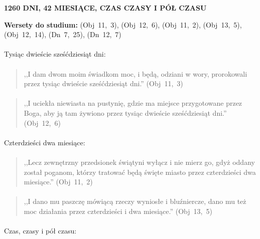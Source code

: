 \documentclass[10pt,a4paper,oneside]{article}
\begin{document}
\centerline{\textbf{\MakeUppercase{1260 dni, 42 miesiące, czas czasy i pół czasu}}}
\begin{center}
\textbf{Wersety do studium:} 
\mbox{(Obj 11, 3)}, \mbox{(Obj 12, 6)}, \mbox{(Obj 11, 2)}, \mbox{(Obj 13, 5)}, \mbox{(Obj 12, 14)}, \mbox{(Dn 7, 25)}, \mbox{(Dn 12, 7)}
\end{center}
\paragraph{}
Tysiąc dwieście sześćdziesiąt dni:
\paragraph{}
\begin{quote}
,,I dam dwom moim świadkom moc, i będą, odziani w wory, prorokowali przez tysiąc dwieście sześćdziesiąt dni.'' \mbox{(Obj 11, 3)}
\end{quote}
\paragraph{}
\begin{quote}
,,I uciekła niewiasta na pustynię, gdzie ma miejsce przygotowane przez Boga, aby ją tam żywiono przez tysiąc dwieście sześćdziesiąt dni.'' \mbox{(Obj 12, 6)}
\end{quote}
\paragraph{}
Czterdzieści dwa miesiące:
\paragraph{}
\begin{quote}
,,Lecz zewnętrzny przedsionek świątyni wyłącz i nie mierz go, gdyż oddany został poganom, którzy tratować będą święte miasto przez czterdzieści dwa miesiące.'' \mbox{(Obj 11, 2)}
\end{quote}
\paragraph{}
\begin{quote}
,,I dano mu paszczę mówiącą rzeczy wyniosłe i bluźniercze, dano mu też moc działania przez czterdzieści i dwa miesiące.'' \mbox{(Obj 13, 5)}
\end{quote}
\paragraph{}
Czas, czasy i pół czasu:
\end{document}
